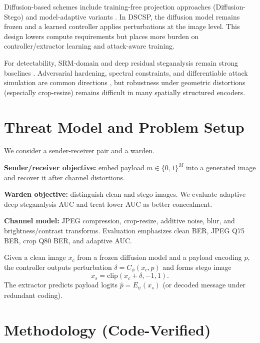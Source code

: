 \documentclass[journal]{IEEEtran}
\begin{document}
Diffusion-based schemes include training-free projection approaches (Diffusion-Stego) \cite{wei2023diffusionstego} and model-adaptive variants \cite{peng2023stegodiffusion,zhang2024ldstega,zhao2024dero}. In DSCSP, the diffusion model remains frozen and a learned controller applies perturbations at the image level. This design lowers compute requirements but places more burden on controller/extractor learning and attack-aware training.

For detectability, SRM-domain and deep residual steganalysis remain strong baselines \cite{fridrich2012rich,boroumand2019deep}. Adversarial hardening, spectral constraints, and differentiable attack simulation are common directions \cite{goodfellow2014generative,miyato2018spectral,bengio2013estimating,shin2017jpeg}, but robustness under geometric distortions (especially crop-resize) remains difficult in many spatially structured encoders.

\section{Threat Model and Problem Setup}
We consider a sender-receiver pair and a warden.

\textbf{Sender/receiver objective:} embed payload $m\in\{0,1\}^{M}$ into a generated image and recover it after channel distortions.

\textbf{Warden objective:} distinguish clean and stego images. We evaluate adaptive deep steganalysis AUC and treat lower AUC as better concealment.

\textbf{Channel model:} JPEG compression, crop-resize, additive noise, blur, and brightness/contrast transforms. Evaluation emphasizes clean BER, JPEG Q75 BER, crop Q80 BER, and adaptive AUC.

Given a clean image $x_c$ from a frozen diffusion model and a payload encoding $p$, the controller outputs perturbation $\delta=C_\phi(x_c,p)$ and forms stego image
\begin{equation}
  x_s = \mathrm{clip}(x_c + \delta, -1, 1).
\end{equation}
The extractor predicts payload logits $\hat{p}=E_\psi(x_s)$ (or decoded message under redundant coding).

\section{Methodology (Code-Verified)}
\end{document}
